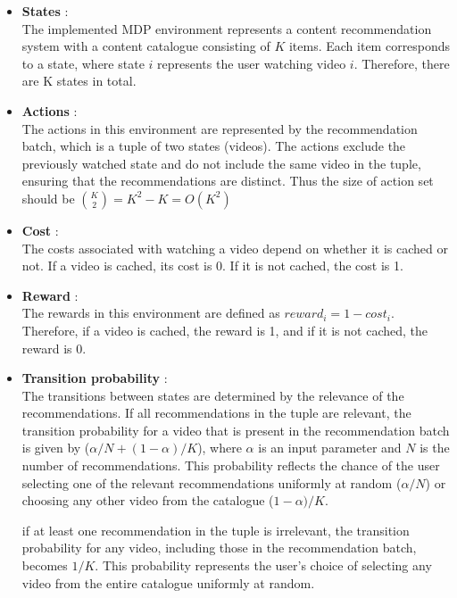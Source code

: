 \documentclass[12pt]{article}
\begin{document}
\begin{itemize}
    \item {\bf States} :\\
    The implemented MDP environment represents a content recommendation system with a content catalogue 
    consisting of $K$ items. Each item corresponds to a state, where state $i$ represents the user watching video $i$. Therefore, there are K states in total.
    \item {\bf Actions} :\\ 
    The actions in this environment are represented by the recommendation batch, which is a tuple of two states (videos). The actions exclude the previously 
    watched state and do not include the same video in the tuple, ensuring that the recommendations are distinct. Thus the size of action set should be ${K \choose 2} = K^2-K = O(K^2)$
    \item {\bf Cost} :\\ 
    The costs associated with watching a video depend on whether it is cached or not. If a video is cached, its cost is 0. If it is not cached, the cost is 1.
    \item {\bf Reward} :\\ 
    The rewards in this environment are defined as $reward_i=1-cost_i$. Therefore, if a video is cached, the reward is 1, and if it is not cached, the reward is 0.
    \item {\bf Transition probability} :\\ 
    The transitions between states are determined by the relevance of the recommendations. If all recommendations in the tuple are relevant, the transition probability for a video that is present in the recommendation batch is given by ($\alpha/N + (1-\alpha)/K$), where $\alpha$ is an input parameter and $N$ is the number of recommendations.
     This probability reflects the chance of the user selecting one of the relevant recommendations uniformly at random ($\alpha/N$) or choosing any other video from the catalogue ($1-\alpha)/K$.

    if at least one recommendation in the tuple is irrelevant, the transition probability for any video, including those in the recommendation batch, becomes $1/K$. This probability represents the user's choice of selecting any video from the entire catalogue uniformly at random.
\end{itemize}
\end{document}

